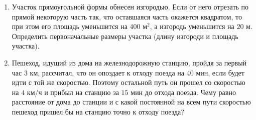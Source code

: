 \documentclass[12pt, a4paper]{article}
\begin{document}
\begin{enumerate}[label=\textbf{\arabic*.}]
$$\begin{array}{l}
			\dfrac{x^2-9}{x^2-8x+16}>0
		\end{array}
		\right.$$
		\item Участок прямоугольной формы обнесен изгородью. Если от него отрезать по прямой некоторую часть так, что оставшаяся часть окажется квадратом, то при этом его площадь уменьшится на $400$ м$^2$, а изгородь уменьшится на $20$ м. Определить первоначальные размеры участка (длину изгороди и площадь участка).
		\item Пешеход, идущий из дома на железнодорожную станцию, пройдя за первый час $3$ км, рассчитал, что он опоздает к отходу поезда на $40$ мин, если будет идти с той же скоростью. Поэтому остальной путь он прошел со скоростью на $4$ км/ч и прибыл на станцию за $15$ мин до отхода поезда. Чему равно расстояние от дома до станции и с какой постоянной на всем пути скоростью пешеход пришел бы на станцию точно к отходу поезда?
	\end{enumerate}
\end{document}
